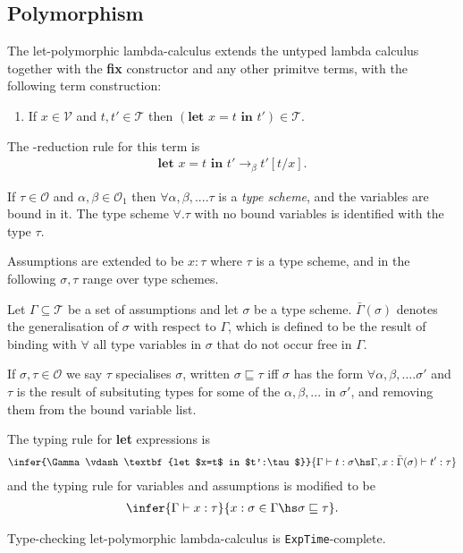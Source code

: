 \documentclass{article}
\begin{document}
\subsection{Polymorphism}

\begin{definition*}
	The let-polymorphic lambda-calculus extends the untyped lambda calculus together with the
	\textbf{fix} constructor and any other primitve terms, with the following term construction:
	\begin{enumerate}[label=L5.]
		\item If $x\in\mathcal{V}$ and $t,t'\in\mathcal{T}$ then $(\textbf{let $x=t$ in $t'$})\in\mathcal{T}$.
	\end{enumerate}
	The \beta-reduction rule for this term is \begin{align*}
		\textbf{let $x=t$ in $t'\to_\beta t'[t/x]$}.
	\end{align*}
\end{definition*}

\begin{definition*}
	If $\tau\in\mathcal{O}$ and $\alpha,\beta\in\mathcal{O}_1$ then $\forall \alpha, \beta, ... .\tau$
	is a \emph{type scheme}, and the variables are bound in it. The type scheme $\forall.\tau$ with
	no bound variables is identified with the type $\tau$.

	Assumptions are extended to be $x:\tau$ where $\tau$ is a type scheme, and in the following $\sigma,\tau$
	range over type schemes.

	Let $\Gamma\subseteq\mathcal{T}$ be a set of assumptions and let $\sigma$ be a type scheme. $\bar\Gamma(\sigma)$ denotes
	the generalisation of $\sigma$ with respect to $\Gamma$, which is defined to be the result of binding
	with $\forall$ all type variables in $\sigma$ that do not occur free in $\Gamma$.

	If $\sigma,\tau\in\mathcal{O}$ we say $\tau$ specialises $\sigma$, written $\sigma\sqsubseteq \tau$
	iff $\sigma$ has the form $\forall \alpha, \beta, ... .\sigma'$ and $\tau$ is the result of subsituting
	types for some of the $\alpha,\beta, ...$ in $\sigma'$, and removing them from the bound variable list.

	The typing rule for \textbf{let} expressions is
	\begin{align*}
		\infer{\Gamma\vdash \textbf{let $x=t$ in $t':\tau$}}{\Gamma\vdash t:\sigma\hs \Gamma,x:\bar\Gamma(\sigma)\vdash t':\tau}
	\end{align*}
	and the typing rule for variables and assumptions is modified to be
	\begin{align*}
		\infer{\Gamma \vdash x:\tau}{x:\sigma \in \Gamma\hs \sigma\sqsubseteq \tau}.
	\end{align*}
\end{definition*}

\begin{theorem*}[III.27]
	Type-checking let-polymorphic lambda-calculus is \texttt{ExpTime}-complete.
\end{theorem*}
\end{document}

